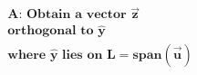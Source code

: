 \documentclass[preview]{standalone}
\begin{document}
\begin{align*}
\textbf{A: Obtain a vector} \,\, \mathbf{\vec{z}} \\ \textbf{orthogonal to} \,\, \mathbf{\hat{y}} \\ \textbf{where} \,\, \mathbf{\hat{y}} \,\, \textbf{lies on} \,\, \mathbf{L} = \textbf{span}(\mathbf{\vec{u}})
\end{align*}
\end{document}

